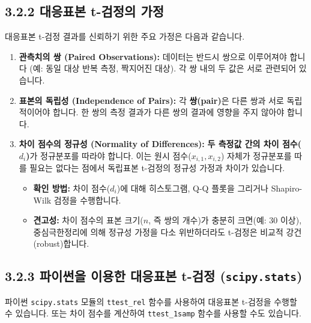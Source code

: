 \documentclass[
  letterpaper,
]{book}
\providecommand{\tightlist}{%
  \setlength{\itemsep}{0pt}\setlength{\parskip}{0pt}}
\begin{document}
\subsection{3.2.2 대응표본 t-검정의
가정}\label{uxb300uxc751uxd45cuxbcf8-t-uxac80uxc815uxc758-uxac00uxc815}

대응표본 t-검정 결과를 신뢰하기 위한 주요 가정은 다음과 같습니다.

\begin{enumerate}
\def\labelenumi{\arabic{enumi}.}
\tightlist
\item
  \textbf{관측치의 쌍 (Paired Observations):} 데이터는 반드시 쌍으로
  이루어져야 합니다 (예: 동일 대상 반복 측정, 짝지어진 대상). 각 쌍 내의
  두 값은 서로 관련되어 있습니다.
\item
  \textbf{표본의 독립성 (Independence of Pairs):} 각 \textbf{쌍(pair)}은
  다른 쌍과 서로 독립적이어야 합니다. 한 쌍의 측정 결과가 다른 쌍의
  결과에 영향을 주지 않아야 합니다.
\item
  \textbf{차이 점수의 정규성 (Normality of Differences):} \textbf{두
  측정값 간의 차이 점수(\(d_i\))}가 정규분포를 따라야 합니다. 이는 원시
  점수(\(x_{i,1}, x_{i,2}\)) 자체가 정규분포를 따를 필요는 없다는 점에서
  독립표본 t-검정의 정규성 가정과 차이가 있습니다.

  \begin{itemize}
  \tightlist
  \item
    \textbf{확인 방법:} 차이 점수(\(d_i\))에 대해 히스토그램, Q-Q 플롯을
    그리거나 Shapiro-Wilk 검정을 수행합니다.
  \item
    \textbf{견고성:} 차이 점수의 표본 크기(\(n\), 즉 쌍의 개수)가 충분히
    크면(예: 30 이상), 중심극한정리에 의해 정규성 가정을 다소
    위반하더라도 t-검정은 비교적 강건(robust)합니다.
  \end{itemize}
\end{enumerate}

\subsection{\texorpdfstring{3.2.3 파이썬을 이용한 대응표본 t-검정
(\texttt{scipy.stats})}{3.2.3 파이썬을 이용한 대응표본 t-검정 (scipy.stats)}}\label{uxd30cuxc774uxc36cuxc744-uxc774uxc6a9uxd55c-uxb300uxc751uxd45cuxbcf8-t-uxac80uxc815-scipy.stats}

파이썬 \texttt{scipy.stats} 모듈의 \texttt{ttest\_rel} 함수를 사용하여
대응표본 t-검정을 수행할 수 있습니다. 또는 차이 점수를 계산하여
\texttt{ttest\_1samp} 함수를 사용할 수도 있습니다.
\end{document}

